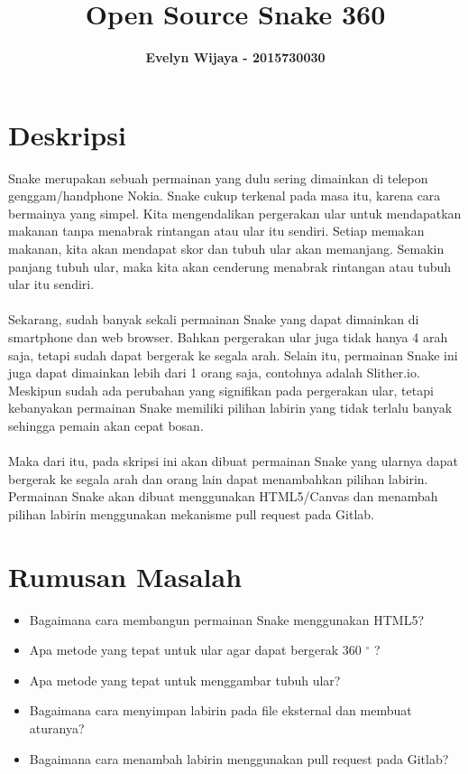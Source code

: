 \documentclass[11pt]{article}
\title{\textbf{Open Source Snake 360}}
\author{\textbf{Evelyn Wijaya - 2015730030}}
\date{}
\begin{document}
\maketitle

\section{Deskripsi}
Snake merupakan sebuah permainan yang dulu sering dimainkan di telepon genggam/handphone Nokia. Snake cukup terkenal pada masa itu, karena cara bermainya yang simpel. Kita mengendalikan pergerakan ular untuk mendapatkan makanan tanpa menabrak rintangan atau ular itu sendiri. Setiap memakan makanan, kita akan mendapat skor dan tubuh ular akan memanjang. Semakin panjang tubuh ular, maka kita akan cenderung menabrak rintangan atau tubuh ular itu sendiri. \\\\
Sekarang, sudah banyak sekali permainan Snake yang dapat dimainkan di smartphone dan web browser. Bahkan pergerakan ular juga tidak hanya 4 arah saja, tetapi sudah dapat bergerak ke segala arah. Selain itu, permainan Snake ini juga dapat dimainkan lebih dari 1 orang saja, contohnya adalah Slither.io. Meskipun sudah ada perubahan yang signifikan pada pergerakan ular, tetapi kebanyakan permainan Snake memiliki pilihan labirin yang tidak terlalu banyak sehingga pemain akan cepat bosan. \\\\
Maka dari itu, pada skripsi ini akan dibuat permainan Snake yang ularnya dapat bergerak ke segala arah dan orang lain dapat menambahkan pilihan labirin. Permainan Snake akan dibuat menggunakan HTML5/Canvas dan menambah pilihan labirin menggunakan mekanisme pull request pada Gitlab.

\section{Rumusan Masalah}
\begin{itemize}
\item Bagaimana cara membangun permainan Snake menggunakan HTML5?
\item Apa metode yang tepat untuk ular agar dapat bergerak 360 $^{\circ}$ ?
\item Apa metode yang tepat untuk menggambar tubuh ular?
\item Bagaimana cara menyimpan labirin pada file eksternal dan membuat aturanya?
\item Bagaimana cara menambah labirin menggunakan pull request pada Gitlab?
\end{itemize}
\end{document}

